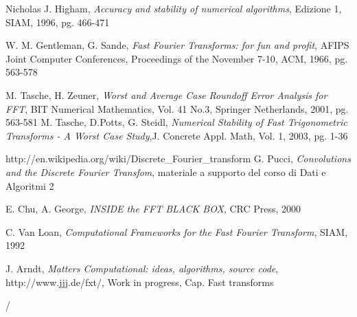 \begin{thebibliography}{99}
 Nicholas J. Higham, \emph{Accuracy and stability of numerical algorithms}, Edizione 1, SIAM, 1996, pg. 466-471

 W. M. Gentleman, G. Sande, \emph{Fast Fourier Transforms: for fun and profit}, AFIPS Joint Computer Conferences, Proceedings of the November 7-10, ACM, 1966, pg. 563-578

M. Tasche, H. Zeuner, \emph{Worst and Average Case Roundoff Error Analysis for FFT}, BIT Numerical Mathematics, Vol. 41 No.3, Springer Netherlands, 2001, pg. 563-581
M. Tasche, D.Potts, G. Steidl, \emph{Numerical Stability of Fast Trigonometric Transforms - A Worst Case Study},J. Concrete Appl. Math, Vol. 1, 2003, pg. 1-36

 http://en.wikipedia.org/wiki/Discrete\_Fourier\_transform
G. Pucci, \emph{Convolutions and the Discrete Fourier Transfom}, materiale a supporto del corso di Dati e Algoritmi 2

 E. Chu, A. George, \emph{INSIDE the FFT BLACK BOX}, CRC Press, 2000

 C. Van Loan, \emph{Computational Frameworks for the Fast Fourier Transform}, SIAM, 1992

 J. Arndt, \emph{Matters Computational: ideas, algorithms, source code}, http://www.jjj.de/fxt/, Work in progress, Cap. Fast transforms





\end{thebibliography}

 / 